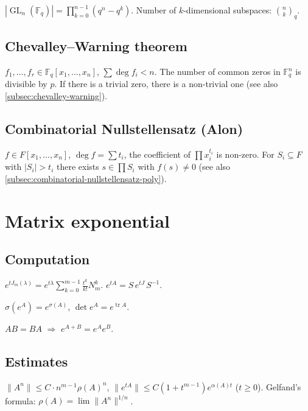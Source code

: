 $|\operatorname{GL}_n(\mathbb{F}_q)|=\prod_{k=0}^{n-1}(q^n-q^k)$. Number of $k$-dimensional subspaces: $\binom{n}{k}_q$.

\subsection{Chevalley--Warning theorem}
\label{subsec:chevalley-warning-linalg}

$f_1,\dots,f_r\in\mathbb{F}_q[x_1,\dots,x_n]$, $\sum\deg f_i<n$. The number of common zeros in $\mathbb{F}_q^n$ is divisible by $p$. If there is a trivial zero, there is a non-trivial one (see also \ref{subsec:chevalley-warning}).

\subsection{Combinatorial Nullstellensatz (Alon)}
\label{subsec:combinatorial-nullstellensatz}

$f\in F[x_1,\dots,x_n]$, $\deg f=\sum t_i$, the coefficient of $\prod x_i^{t_i}$ is non-zero. For $S_i\subseteq F$ with $|S_i|>t_i$ there exists $s\in\prod S_i$ with $f(s)\neq0$ (see also \ref{subsec:combinatorial-nullstellensatz-poly}).

\medskip

\section{Matrix exponential}
\label{sec:matrix-exponential}

\subsection{Computation}
\label{subsec:exp-computation}

$e^{tJ_m(\lambda)}=e^{t\lambda}\sum_{k=0}^{m-1}\frac{t^k}{k!}N_m^k$. $e^{tA}=S\,e^{tJ}\,S^{-1}$.

$\sigma(e^A)=e^{\sigma(A)}$, $\det e^A=e^{\operatorname{tr}A}$.

$AB=BA$ $\Rightarrow$ $e^{A+B}=e^A e^B$.

\subsection{Estimates}
\label{subsec:exp-estimates}

$\|A^n\|\le C\cdot n^{m-1}\rho(A)^n$, $\|e^{tA}\|\le C(1+t^{m-1})e^{\alpha(A)t}$ ($t\ge0$). Gelfand's formula: $\rho(A)=\lim\|A^n\|^{1/n}$.

